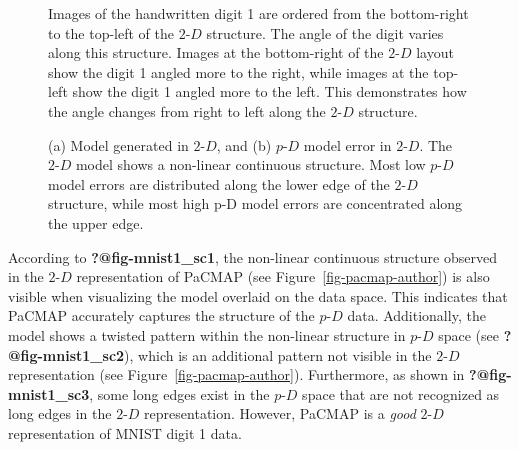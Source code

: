 \documentclass[
  12pt]{article}
\newcommand\pD{$p\text{-}D$}
\newcommand\gD{$2\text{-}D$}
\begin{document}
\begin{figure}[H]


\caption{\label{fig-pacmap-author-img}Images of the handwritten digit 1
are ordered from the bottom-right to the top-left of the \(2\text{-}D\)
structure. The angle of the digit varies along this structure. Images at
the bottom-right of the \(2\text{-}D\) layout show the digit 1 angled
more to the right, while images at the top-left show the digit 1 angled
more to the left. This demonstrates how the angle changes from right to
left along the \(2\text{-}D\) structure.}

\end{figure}%

\begin{figure}[H]


\caption{\label{fig-model-mnist}(a) Model generated in \(2\text{-}D\),
and (b) \(p\text{-}D\) model error in \(2\text{-}D\). The \(2\text{-}D\)
model shows a non-linear continuous structure. Most low \(p\text{-}D\)
model errors are distributed along the lower edge of the \(2\text{-}D\)
structure, while most high p-D model errors are concentrated along the
upper edge.}

\end{figure}%

According to \textbf{?@fig-mnist1\_sc1}, the non-linear continuous
structure observed in the \gD{} representation of PaCMAP (see
Figure~\ref{fig-pacmap-author}) is also visible when visualizing the
model overlaid on the data space. This indicates that PaCMAP accurately
captures the structure of the \pD{} data. Additionally, the model shows
a twisted pattern within the non-linear structure in \pD{} space (see
\textbf{?@fig-mnist1\_sc2}), which is an additional pattern not visible
in the \gD{} representation (see Figure~\ref{fig-pacmap-author}).
Furthermore, as shown in \textbf{?@fig-mnist1\_sc3}, some long edges
exist in the \pD{} space that are not recognized as long edges in the
\gD{} representation. However, PaCMAP is a \emph{good} \gD{}
representation of MNIST digit 1 data.
\end{document}
